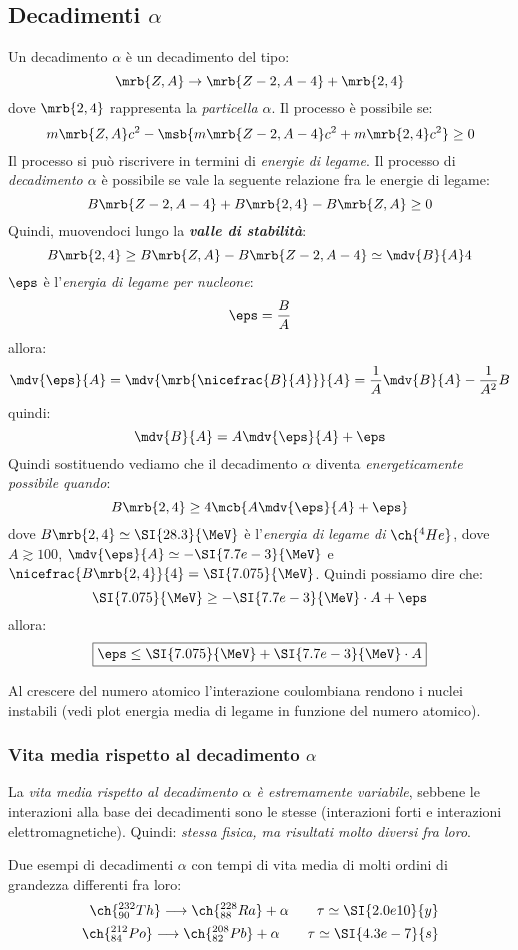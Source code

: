 \subsection{Decadimenti $\alpha$}
Un decadimento $\alpha$ è un decadimento del tipo:
\[
  \mrb{Z, A} \rightarrow \mrb{Z - 2, A - 4} + \mrb{2, 4}
\]
dove $\mrb{2, 4}$ rappresenta la \textit{particella $\alpha$}.
Il processo è possibile se:
\[
  m \mrb{Z, A} c^2 - \msb{m \mrb{Z - 2, A - 4} c^2 + m \mrb{2, 4} c^2} \geq 0
\]
Il processo si può riscrivere in termini di \textit{energie di legame}. Il
processo di \textit{decadimento $\alpha$} è possibile se vale la seguente
relazione fra le energie di legame:
\[
  B \mrb{Z - 2, A - 4} + B \mrb{2, 4} - B \mrb{Z, A} \geq 0
\]
Quindi, muovendoci lungo la \textit{\textbf{valle di stabilità}}:
\[
  B \mrb{2, 4} \geq B \mrb{Z, A} - B \mrb{Z - 2, A - 4} \simeq \mdv{B}{A} 4
\]
$\eps$ è l'\textit{energia di legame per nucleone}:
\[
  \eps = \frac{B}{A}
\]
allora:
\[
  \mdv{\eps}{A} = \mdv{\mrb{\nicefrac{B}{A}}}{A} = \frac{1}{A} \mdv{B}{A} -
  \frac{1}{A^2} B
\]
quindi:
\[
  \mdv{B}{A} = A \mdv{\eps}{A} + \eps
\]
Quindi sostituendo vediamo che il decadimento $\alpha$ diventa
\textit{energeticamente possibile quando}:
\[
  B \mrb{2, 4} \geq 4 \mcb{A \mdv{\eps}{A} + \eps}
\]
dove $B \mrb{2, 4} \simeq \SI{28.3}{\MeV}$ è l'\textit{energia di legame
di} $\ch{^4He}$, dove $A \gtrsim 100$, $\mdv{\eps}{A} \simeq -
\SI{7.7e-3}{\MeV}$ e $\nicefrac{B \mrb{2, 4}}{4} = \SI{7.075}{\MeV}$. Quindi
possiamo dire che:
\[
  \SI{7.075}{\MeV} \geq - \SI{7.7e-3}{\MeV} \cdot A + \eps
\]
allora:
\[
  \boxed{
    \eps \leq \SI{7.075}{\MeV} + \SI{7.7e-3}{\MeV} \cdot A
  }
\]


\begin{note}[]
  Al crescere del numero atomico l'interazione coulombiana rendono i nuclei
  instabili (vedi plot energia media di legame in funzione del numero atomico).
\end{note}

\subsubsection{Vita media rispetto al decadimento $\alpha$}
La \textit{vita media rispetto al decadimento $\alpha$ è estremamente
variabile}, sebbene le interazioni alla base dei decadimenti sono le stesse
(interazioni forti e interazioni elettromagnetiche).
Quindi: \textit{stessa fisica, ma risultati molto diversi fra loro}.
\begin{example}[]
  Due esempi di decadimenti $\alpha$ con tempi di vita media di molti ordini di
  grandezza differenti fra loro:
  \begin{align*}
    \ch{^{232}_{90}Th} \longrightarrow \ch{^{228}_{88} Ra} + \alpha
    \qquad
    \tau \simeq \SI{2.0e10}{y}
    \\
    \ch{^{212}_{84} Po} \longrightarrow \ch{^{208}_{82} Pb} + \alpha
    \qquad
    \tau \simeq \SI{4.3e-7}{s}
  \end{align*}

\end{example}

